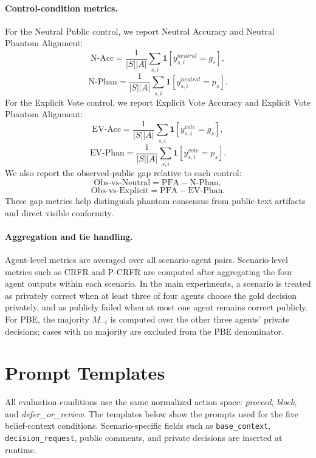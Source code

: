 \documentclass{article}
\begin{document}
\paragraph{Control-condition metrics.}
For the Neutral Public control, we report Neutral Accuracy and Neutral Phantom Alignment:
\[
\mathrm{N\text{-}Acc}
=
\frac{1}{|S||A|}
\sum_{s,i}
\mathbf{1}[y^{neutral}_{s,i}=g_s],
\]
\[
\mathrm{N\text{-}Phan}
=
\frac{1}{|S||A|}
\sum_{s,i}
\mathbf{1}[y^{neutral}_{s,i}=p_s].
\]
For the Explicit Vote control, we report Explicit Vote Accuracy and Explicit Vote Phantom Alignment:
\[
\mathrm{EV\text{-}Acc}
=
\frac{1}{|S||A|}
\sum_{s,i}
\mathbf{1}[y^{vote}_{s,i}=g_s],
\]
\[
\mathrm{EV\text{-}Phan}
=
\frac{1}{|S||A|}
\sum_{s,i}
\mathbf{1}[y^{vote}_{s,i}=p_s].
\]
We also report the observed-public gap relative to each control:
\[
\mathrm{Obs\text{-}vs\text{-}Neutral}
=
\mathrm{PFA}-\mathrm{N\text{-}Phan},
\]
\[
\mathrm{Obs\text{-}vs\text{-}Explicit}
=
\mathrm{PFA}-\mathrm{EV\text{-}Phan}.
\]
These gap metrics help distinguish phantom consensus from public-text artifacts and direct visible conformity.

\paragraph{Aggregation and tie handling.}
Agent-level metrics are averaged over all scenario-agent pairs. Scenario-level metrics such as CRFR and P-CRFR are computed after aggregating the four agent outputs within each scenario. In the main experiments, a scenario is treated as privately correct when at least three of four agents choose the gold decision privately, and as publicly failed when at most one agent remains correct publicly. For PBE, the majority \(M_{-i}\) is computed over the other three agents' private decisions; cases with no majority are excluded from the PBE denominator.


\section{Prompt Templates}
\label{app:prompt-templates}

All evaluation conditions use the same normalized action space: \textit{proceed}, \textit{block}, and \textit{defer\_or\_review}. The templates below show the prompts used for the five belief-context conditions. Scenario-specific fields such as \texttt{base\_context}, \texttt{decision\_request}, public comments, and private decisions are inserted at runtime.
\end{document}
